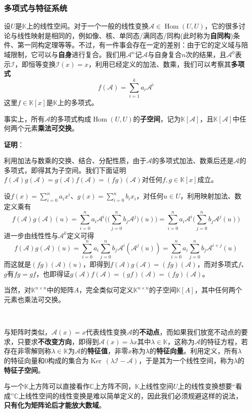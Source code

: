 \documentclass[a4paper,UTF8,fontset=windows,AutoFakeBold]{ctexart}
\DeclareMathOperator{\Ker}{Ker\,}
\DeclareMathOperator{\Hom}{Hom}
\newcommand*{\ma}{\mathcal{A}}
\newcommand*{\mi}{\mathcal{I}}
\newcommand*{\note}{\noindent *}
\newcommand{\proo}[1]{{\vspace{5pt}\kaishu\noindent\textbf{证明}：\vspace{-3pt}
\begin{compactitem}
    \item[] #1
\end{compactitem}
}}
\begin{document}
\subsubsection{多项式与特征系统}
设$U$是$\mathbb{K}$上的线性空间。对于一个一般的线性变换$\ma\in\Hom(U,U)$，它的很多讨论与线性映射是相同的，例如像、核、单同态/满同态/同构(此时称为\textbf{自同构})条件、第一同构定理等等。不过，有一件事会存在一定的差别：由于它的定义域与陪域限制，它可以与\textbf{自身}进行复合。我们用$\ma^n$记$\ma$与自身复合$n$次的结果，且$\ma^0$表示$\mi$，即恒等变换$\mi(x)=x$，利用已经定义的加法、数乘，我们可以考察其\textbf{多项式}
$$f(\ma)=\sum_{i=1}^ka_i\ma^i$$
这里$f\in\mathbb{K}[x]$是$\mathbb{K}$上的多项式。

事实上，所有$\ma$的多项式构成$\Hom(U,U)$的\textbf{子空间}，记为$\mathbb{K}[\ma]$，且$\mathbb{K}[\ma]$中任何两个元素\textbf{乘法可交换}。

\proo{
    利用加法与数乘的交换、结合、分配性质，由于$\ma$的多项式加法、数乘后还是$\ma$的多项式，即得其为子空间。我们下面证明$f(\ma)g(\ma)=g(\ma)f(\ma)=(fg)(\ma)$对任何$f,g\in\mathbb{K}[x]$成立。

    设$f(x)=\sum_{i=0}^na_ix^i$、$g(x)=\sum_{i=0}^nb_ix_i$，对任何$u\in U$，利用映射加法、数定义乘有
    $$f(\ma)g(\ma)(u)=\sum_{i=0}^na_i\ma^i\bigg(\bigg(\sum_{j=0}^nb_j\ma^j\bigg)(u)\bigg)=\sum_{i=0}^na_i\ma^i\bigg(\sum_{j=0}^nb_j\ma^j(u)\bigg)$$
    进一步由线性性与$\ma^k$定义可得
    $$f(\ma)g(\ma)(u)=\sum_{i=0}^na_i\sum_{j=0}^nb_j\ma^i(\ma^j(u))=\sum_{i=0}^na_i\sum_{j=0}^nb_j\ma^{i+j}(u)$$
    而这就是$(fg)(\ma)(u)$，即得到$f(\ma)g(\ma)=(fg)(\ma)$，而对多项式$f$、$g$有$fg=gf$，也即得证$g(\ma)f(\ma)=(gf)(\ma)=(fg)(\ma)$。
}

\note 当然，对$\mathbb{K}^{n\times n}$中的矩阵$A$，完全类似可定义$\mathbb{K}^{n\times n}$的子空间$\mathbb{K}[A]$，其中任何两个元素也乘法可交换。

\

与矩阵时类似，$\ma(x)=x$代表线性变换$\ma$的\textbf{不动点}，而如果我们放宽不动点的要求，只要求\textbf{不改变方向}，即得到$\ma(x)=\lambda x$其中$\lambda\in\mathbb{K}$，这称为$\ma$的特征方程，若存在非零解则称$\lambda\in\mathbb{K}$为$\ma$的\textbf{特征值}，非零$x$称为$\lambda$的\textbf{特征向量}。利用定义，所有$\lambda$的特征向量和0构成的集合为$\Ker(\lambda\mi-\ma)$，于是其为一个线性空间，称为$\lambda$的\textbf{特征子空间}。

\note 与一个$\mathbb{K}$上方阵可以直接看作$\mathbb{C}$上方阵不同，$\mathbb{K}$上线性空间$U$上的线性变换想要``看成''$\mathbb{C}$上线性空间的线性变换是难以简单定义的，因此我们必须规避这样的说法，\textbf{只有化为矩阵论后才能放大数域}。
\end{document}
